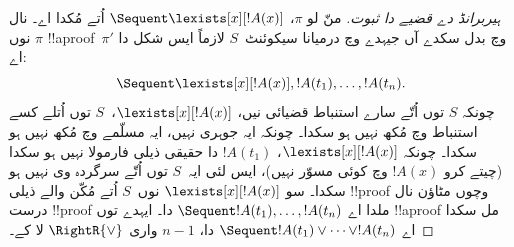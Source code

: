 \documentclass[../../../include/open-logic-section]{subfiles}
\begin{document}
\begin{proof}[ہیربرانڈ دے قضیے دا ثبوت]
منّ لو $\pi$، $\Sequent \lexists[x][!A(x)]$ اُتے مُکدا اے۔  نال $\pi$ نوں !!a{proof}~$\pi'$ وچ بدل سکدے آں جیہدے وچ درمیانا سیکوئنٹ~$S$ لازماً ایس شکل دا اے:
\[\Sequent
\lexists[x][!A(x)], !A(t_1), \dots, !A(t_n).\]
چونکہ $S$ توں اُتّے سارے استنباط قضیائی نیں، $\lexists[x][!A(x)]$،~$S$ توں اُتلے کسے استنباط وچ مُکھ نہیں ہو سکدا۔ چونکہ ایہ جوہری نہیں، ایہ مسلّمے وچ مُکھ نہیں ہو سکدا۔ چونکہ $\lexists[x][!A(x)]$، $!A(t_1)$ دا حقیقی ذیلی فارمولا نہیں ہو سکدا (چیتے کرو $!A(x)$ وچ کوئی مسوّر نہیں)، ایس لئی ایہ~$S$ توں اُتّے سرگردہ وی نہیں ہو سکدا۔ سو $\lexists[x][!A(x)]$ نوں~$S$ اُتے مُکّن والے ذیلی !!{proof} وچوں مٹاؤن نال درست !!{proof} ملدا اے $\Sequent !A(t_1), \dots, !A(t_n)$ دا۔ ایہدے توں !!a{proof} مل سکدا اے $\Sequent !A(t_1) \lor \dots \lor !A(t_n)$ دا، $n-1$ واری $\RightR{\lor}$ لا کے۔
\end{proof}

\end{document}
